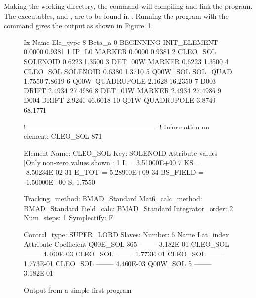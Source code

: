 Making  the working directory, the 
command will compiling and link the program.  The
executables,  and , are to be
found in . Running the program with the command
 gives the output as shown in
Figure~\ref{f:output}.

\begin{figure}[ht]
\begin{listing}{1}
  Ix  Name              Ele_type                   S      Beta_a
   0  BEGINNING         INIT_ELEMENT          0.0000      0.9381
   1  IP_L0             MARKER                0.0000      0.9381
   2  CLEO_SOL\3        SOLENOID              0.6223      1.3500
   3  DET_00W           MARKER                0.6223      1.3500
   4  CLEO_SOL\4        SOLENOID              0.6380      1.3710
   5  Q00W\CLEO_SOL     SOL_QUAD              1.7550      7.8619
   6  Q00W\             QUADRUPOLE            2.1628     16.2350
   7  D003              DRIFT                 2.4934     27.4986
   8  DET_01W           MARKER                2.4934     27.4986
   9  D004              DRIFT                 2.9240     46.6018
  10  Q01W              QUADRUPOLE            3.8740     68.1771

 !---------------------------------------------------------
 ! Information on element: CLEO_SOL 871

  Element Name: CLEO_SOL
  Key: SOLENOID
  Attribute values [Only non-zero values shown]:
      1   L                =  3.51000E+00
      7   KS               = -8.50234E-02
     31   E_TOT            =  5.28900E+09
     34   BS_FIELD         = -1.50000E+00
  S:       1.7550

  Tracking_method:  BMAD_Standard
  Mat6_calc_method: BMAD_Standard
  Field_calc:       BMAD_Standard
  Integrator_order:   2
  Num_steps:          1
  Symplectify:        F

  Control_type: SUPER_LORD
  Slaves: Number:   6
      Name             Lat_index  Attribute       Coefficient
      Q00E\CLEO_SOL          865  --------          3.182E-01
      CLEO_SOL  --------          4.460E-03
      CLEO_SOL  --------          1.773E-01
      CLEO_SOL  --------          1.773E-01
      CLEO_SOL  --------          4.460E-03
      Q00W\CLEO_SOL            5  --------          3.182E-01
\end{listing}
\caption{Output from a simple first program}
\label{f:output}
\end{figure}


